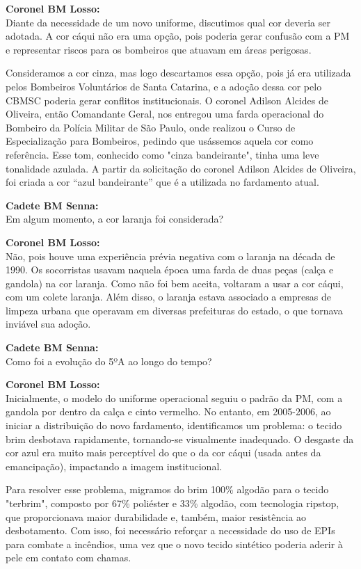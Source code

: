 \noindent \textbf{Coronel BM Losso:} \\ Diante da necessidade de um novo uniforme, discutimos qual cor deveria ser adotada. A cor cáqui não era uma opção, pois poderia gerar confusão com a PM e representar riscos para os bombeiros que atuavam em áreas perigosas. 

\noindent Consideramos a cor cinza, mas logo descartamos essa opção, pois já era utilizada pelos Bombeiros Voluntários de Santa Catarina, e a adoção dessa cor pelo CBMSC poderia gerar conflitos institucionais. O coronel Adilson Alcides de Oliveira, então Comandante Geral, nos entregou uma farda operacional do Bombeiro da Polícia Militar de São Paulo, onde realizou o Curso de Especialização para Bombeiros, pedindo que usássemos aquela cor como referência. Esse tom, conhecido como "cinza bandeirante", tinha uma leve tonalidade azulada. A partir da solicitação do coronel Adilson Alcides de Oliveira, foi criada a cor “azul bandeirante” que é a utilizada no fardamento atual.

\noindent \textbf{Cadete BM Senna:} \\ Em algum momento, a cor laranja foi considerada?

\noindent \textbf{Coronel BM Losso:} \\ Não, pois houve uma experiência prévia negativa com o laranja 
na década de 1990. Os socorristas usavam naquela época uma farda de duas peças (calça e gandola) 
na cor laranja. Como não foi bem aceita, voltaram a usar a cor cáqui, com um colete laranja.
 Além disso, o laranja estava associado a empresas de limpeza urbana que operavam em diversas prefeituras
  do estado, o que tornava inviável sua adoção.

\noindent \textbf{Cadete BM Senna:} \\ Como foi a evolução do 5ºA ao longo do tempo?

\noindent \textbf{Coronel BM Losso:} \\ Inicialmente, o modelo do uniforme operacional seguiu o padrão da
 PM, com a gandola por dentro da calça e cinto vermelho. No entanto, em 2005-2006, ao iniciar a 
 distribuição do novo fardamento, identificamos um problema: o tecido brim desbotava rapidamente, tornando-se
  visualmente inadequado. O desgaste da cor azul era muito mais perceptível do que o da cor cáqui
   (usada antes da emancipação), impactando a imagem institucional.

\noindent Para resolver esse problema, migramos do brim 100\% algodão para o tecido "terbrim", composto por 67\% poliéster e 33\% algodão, com tecnologia ripstop, que proporcionava maior durabilidade e, também, maior resistência ao desbotamento. Com isso, foi necessário reforçar a necessidade do uso de EPIs para combate a incêndios, uma vez que o novo tecido sintético poderia aderir à pele em contato com chamas.

